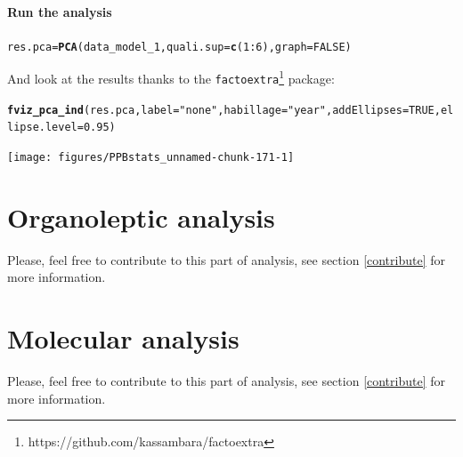 \documentclass{book}\usepackage[]{graphicx}\usepackage[]{color}
\makeatletter
\newcommand{\hlnum}[1]{\textcolor[rgb]{0.686,0.059,0.569}{#1}}%
\newcommand{\hlstr}[1]{\textcolor[rgb]{0.192,0.494,0.8}{#1}}%
\newcommand{\hlopt}[1]{\textcolor[rgb]{0,0,0}{#1}}%
\newcommand{\hlstd}[1]{\textcolor[rgb]{0.345,0.345,0.345}{#1}}%
\newcommand{\hlkwb}[1]{\textcolor[rgb]{0.69,0.353,0.396}{#1}}%
\newcommand{\hlkwc}[1]{\textcolor[rgb]{0.333,0.667,0.333}{#1}}%
\newcommand{\hlkwd}[1]{\textcolor[rgb]{0.737,0.353,0.396}{\textbf{#1}}}%
\newenvironment{kframe}{%
 \def\at@end@of@kframe{}%
 \ifinner\ifhmode%
  \def\at@end@of@kframe{\end{minipage}}%
  \begin{minipage}{\columnwidth}%
 \fi\fi%
 \def\FrameCommand##1{\hskip\@totalleftmargin \hskip-\fboxsep
 \colorbox{shadecolor}{##1}\hskip-\fboxsep
     \hskip-\linewidth \hskip-\@totalleftmargin \hskip\columnwidth}%
 \MakeFramed {\advance\hsize-\width
   \@totalleftmargin\z@ \linewidth\hsize
   \@setminipage}}%
 {\par\unskip\endMakeFramed%
 \at@end@of@kframe}
\newenvironment{knitrout}{}{} %
\makeatother
\begin{document}
\subsubsection{Run the analysis}


\begin{knitrout}
\color{fgcolor}\begin{kframe}
\begin{alltt}
\hlstd{res.pca} \hlkwb{=} \hlkwd{PCA}\hlstd{(data_model_1,} \hlkwc{quali.sup} \hlstd{=} \hlkwd{c}\hlstd{(}\hlnum{1}\hlopt{:}\hlnum{6}\hlstd{),} \hlkwc{graph} \hlstd{=} \hlnum{FALSE}\hlstd{)}
\end{alltt}
\end{kframe}
\end{knitrout}

And look at the results thanks to the \texttt{factoextra}\footnote{https://github.com/kassambara/factoextra} package:

\begin{knitrout}
\color{fgcolor}\begin{kframe}
\begin{alltt}
\hlkwd{fviz_pca_ind}\hlstd{(res.pca,} \hlkwc{label}\hlstd{=}\hlstr{"none"}\hlstd{,} \hlkwc{habillage}\hlstd{=}\hlstr{"year"}\hlstd{,} \hlkwc{addEllipses}\hlstd{=}\hlnum{TRUE}\hlstd{,} \hlkwc{ellipse.level}\hlstd{=}\hlnum{0.95}\hlstd{)}
\end{alltt}
\end{kframe}

{\centering \texttt{[image: figures/PPBstats\_unnamed-chunk-171-1]} 

}



\end{knitrout}

\newpage

\chapter{Organoleptic analysis}
\label{organoleptic}
Please, feel free to contribute to this part of analysis, see section \ref{contribute} for more information.

\chapter{Molecular analysis}
\label{molecular}
Please, feel free to contribute to this part of analysis, see section \ref{contribute} for more information.
\end{document}
